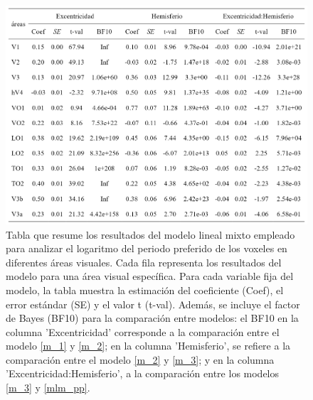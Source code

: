 \begin{figure}
	\centering
	\includegraphics[scale=0.8]{Graphics/table_pp}
	\caption{Tabla que resume los resultados del modelo lineal mixto empleado para analizar el logaritmo del periodo preferido de los voxeles en diferentes áreas visuales. Cada fila representa los resultados del modelo para una área visual específica. Para cada variable fija del modelo, la tabla muestra la estimación del coeficiente (Coef), el error estándar (SE) y el valor t (t-val). Además, se incluye el factor de Bayes (BF10) para la comparación entre modelos: el BF10 en la columna 'Excentricidad' corresponde a la comparación entre el modelo \ref{m_1} y \ref{m_2}; en la columna 'Hemisferio', se refiere a la comparación entre el modelo \ref{m_2} y \ref{m_3}; y en la columna 'Excentricidad:Hemisferio', a la comparación entre los modelos \ref{m_3} y \ref{mlm_pp}.}
	\label{fig:mlm_results_pp}
\end{figure}






